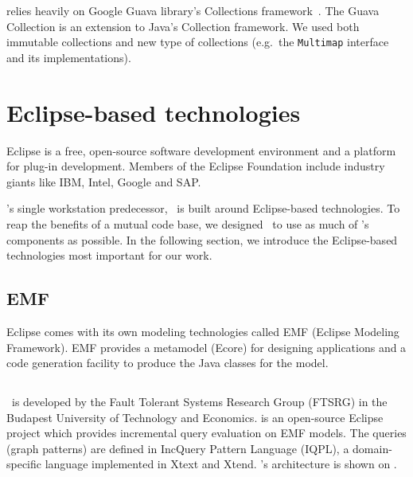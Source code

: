 \iqd{} relies heavily on Google Guava library's Collections framework~\cite{guava}. The Guava Collection is an extension to Java's Collection framework. We used both immutable collections and new type of collections (e.g.\ the \texttt{Multimap} interface and its implementations).

\section{Eclipse-based technologies}

Eclipse is a free, open-source software development environment and a platform for plug-in development. Members of the Eclipse Foundation include industry giants like IBM, Intel, Google and SAP.

\iqd's single workstation predecessor, \eiq\ is built around Eclipse-based technologies. To reap the benefits of a mutual code base, we designed \iqd\ to use as much of \eiq's components as possible. In the following section, we introduce the Eclipse-based technologies most important for our work.

\subsection{EMF}
\label{subsec:EMF}

Eclipse comes with its own modeling technologies called EMF (Eclipse Modeling Framework). EMF provides a metamodel (Ecore) for designing applications and a code generation facility to produce the Java classes for the model.

\subsection{\eiq{}}
\label{subsec:eiq}

\eiq{}\ is developed by the Fault Tolerant Systems Research Group (FTSRG) in the Budapest University of Technology and Economics. \eiq is an open-source Eclipse project which provides incremental query evaluation on EMF models. The queries (graph patterns) are defined in IncQuery Pattern Language (IQPL), a domain-specific language implemented in Xtext and Xtend. \eiq{}'s architecture is shown on .


